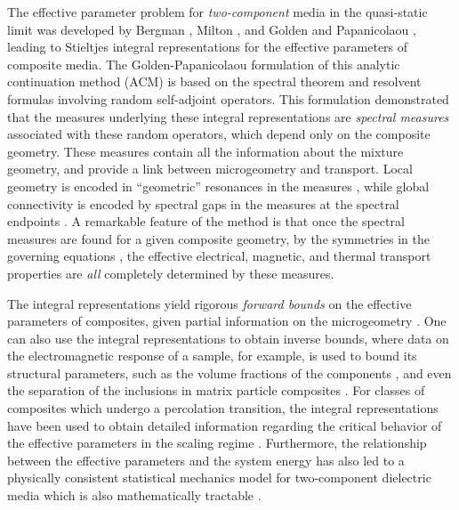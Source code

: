 \documentclass{cmslatex}
\begin{document}
The effective parameter problem for \emph{two-component} media in the
quasi-static limit was developed by Bergman \cite{Bergman:PRL-1285},
Milton \cite{Milton:APL-300}, and Golden and Papanicolaou
\cite{Golden:CMP-473}, leading to Stieltjes integral representations 
for the effective parameters of composite media. The
Golden-Papanicolaou formulation of this analytic continuation method
(ACM) is based on the spectral theorem and resolvent formulas
involving random self-adjoint operators. This formulation demonstrated
that the measures underlying these integral representations are
\emph{spectral measures} associated with these random operators, which
depend only on the composite geometry. These measures contain all the
information about the mixture geometry, and provide a link between
microgeometry and transport. Local geometry is encoded in
``geometric'' resonances in the measures
\cite{Jonckheere_Luck_JPA_1998}, while global connectivity is encoded
by spectral gaps in the measures at the spectral endpoints
\cite{Murphy:JMP:063506,Jonckheere_Luck_JPA_1998}. A remarkable
feature of the method is that once the spectral measures are found for 
a given composite geometry, by the symmetries in the governing
equations \cite{MILTON:2002:TC}, the effective electrical, magnetic,
and thermal transport properties are \emph{all} completely determined
by these measures.


The integral representations yield rigorous \emph{forward bounds} on
the effective parameters of composites, given partial information on
the microgeometry
\cite{Bergman:PRL-1285,Milton:APL-300,Golden:CMP-473,Bergman:AP-78}. One  
can also use the integral representations to obtain inverse bounds,
where data on the electromagnetic response of a sample, for example,
is used to bound its structural parameters, such as the volume
fractions of the components
\cite{Cherkaeva:WRM-437,Cherkaeva:IP-1203,Cherkaeva:IP-065008,Zhang:JCP-5390,Bonifasi-Lista:PMB-3063,Cherkaev:JBiomech-345,Day:JPCM-99,Golden:J_Biomech:337},
and even the separation of the inclusions in matrix particle
composites \cite{Orum:PRSLA:2012}. For classes of composites which
undergo a percolation transition, the integral representations have
been used to obtain detailed information regarding the critical
behavior of the effective parameters in the scaling regime
\cite{Golden:PRL-3935,Murphy:JMP:063506}. Furthermore, the
relationship between the effective parameters and the system energy
has also led to a physically consistent statistical mechanics model
for two-component dielectric media which is also mathematically
tractable \cite{Murphy_Thermo_Stat_Mech}.  
\end{document}
